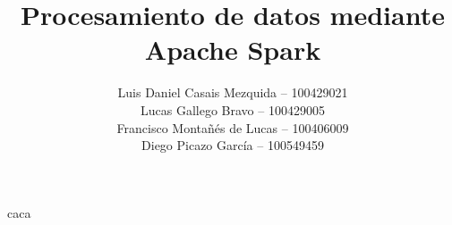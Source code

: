 \documentclass[es]{uc3mreport}
\author{
    Luis Daniel Casais Mezquida -- 100429021\\
    Lucas Gallego Bravo -- 100429005\\
    Francisco Montañés de Lucas -- 100406009\\
    Diego Picazo García -- 100549459
}
\title{Procesamiento de datos mediante Apache Spark}
\begin{document}
    \makecover

    \tableofcontents

    \begin{report}
        caca
    \end{report}


\end{document}
